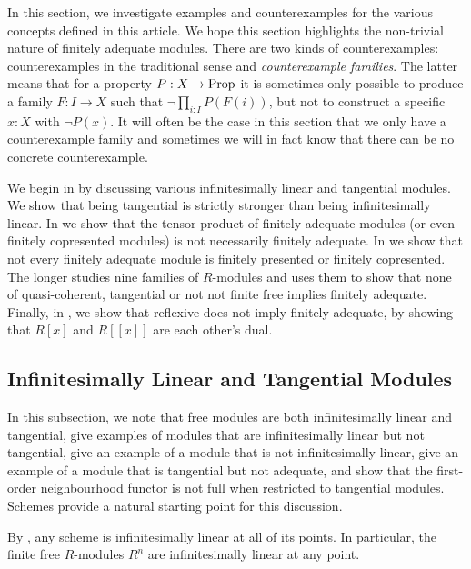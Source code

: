 In this section, we investigate examples and counterexamples for the various concepts defined in this article.
We hope this section highlights the non-trivial nature of finitely adequate modules.
There are two kinds of counterexamples: counterexamples in the traditional sense and \emph{counterexample families}. The latter means that for a property \(P:X\to \mathrm{Prop}\) it is sometimes only possible to produce a family \(F:I\to X\) such that \(\neg \prod_{i:I}P(F(i))\), but not to construct a specific \(x:X\) with \(\neg P(x)\). It will often be the case in this section that we only have a counterexample family and sometimes we will in fact know that there can be no concrete counterexample.

We begin in  by discussing various infinitesimally linear and tangential modules.
We show that being tangential is strictly stronger than being infinitesimally linear.
In  we show that the tensor product of finitely adequate modules (or even finitely copresented modules) is not necessarily finitely adequate.
In  we show that not every finitely adequate module is finitely presented or finitely copresented.
The longer  studies nine families of $R$-modules
and uses them to show that none of quasi-coherent, tangential or
not not finite free implies finitely adequate.
Finally, in , we show that reflexive does not imply
finitely adequate, by showing that $R[x]$ and $R[[x]]$ are each other's dual.

\subsection{Infinitesimally Linear and Tangential Modules}\label{ss:ex-inf-lin}
In this subsection, we note that free modules are both infinitesimally linear and tangential,
give examples of modules that are infinitesimally linear but not tangential,
give an example of a module that is not infinitesimally linear,
give an example of a module that is tangential but not adequate,
and show that the first-order neighbourhood functor is not full when restricted to tangential modules.
Schemes provide a natural starting point for this discussion.

\begin{example}\label{ex:sch-inf-lin}
  By \cite[Lemma 2.2.5]{diffgeo-article}, any scheme is infinitesimally linear at all of its points.
  In particular, the finite free $R$-modules $R^n$ are infinitesimally linear at any point.
\end{example}


